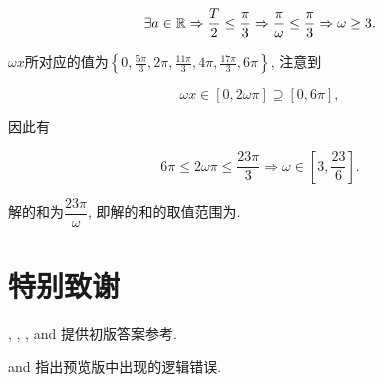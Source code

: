 \documentclass[8pt]{article}
\begin{document}
\begin{enumerate}[label=\defmath{(\arabic*)}]
					\[
						\exists a\in \mathbb{R} \Rightarrow \frac{T}{2} \leq \frac{\pi}{3} \Rightarrow \frac{\pi}{\omega} \leq \frac{\pi}{3} \Rightarrow \omega \geq 3.
					\]

					\(\omega x\)所对应的值为\(\displaystyle \left\{0, \frac{5\pi}{3}, 2\pi, \frac{11\pi}{3}, 4\pi, \frac{17\pi}{3}, 6\pi\right\}\), 注意到

					\[
						\omega x \in [0, 2\omega \pi] \supseteq [0, 6\pi],
					\]

					因此有

					\[
						6\pi \leq 2\omega \pi \leq \frac{23\pi}{3} \Rightarrow \omega \in \left[3, \frac{23}{6}\right].
					\]

					解的和为\(\dfrac{23\pi}{\omega}\), 即解的和的取值范围为.

			\end{enumerate}

	\section{特别致谢}
		, , , and 提供初版答案参考.

		and 指出预览版中出现的逻辑错误.
\end{document}
